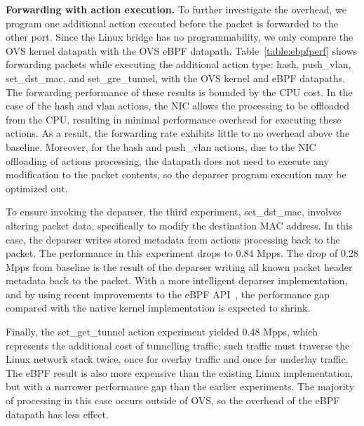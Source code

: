 \documentclass[10pt,numbers,reprint]{sigplanconf}
\begin{document}
\textbf{Forwarding with action execution.}
To further investigate the overhead,
we program one additional action executed before the packet is
forwarded to the other port.  Since the Linux bridge has no
programmability, we only compare the OVS kernel datapath with the OVS eBPF
datapath.  Table~\ref{table:ebpfperf} shows forwarding
packets while executing the additional action type: hash, push\_vlan,
set\_dst\_mac, and set\_gre\_tunnel, with the OVS kernel and eBPF datapaths.
The forwarding performance of these results is bounded by the CPU cost.
In the case of the hash and vlan actions, the NIC allows the processing
to be offloaded from the CPU, resulting in minimal performance overhead for
executing these actions.  As a result, the forwarding rate exhibits little
to no overhead above the baseline.
Moreover, for the hash and push\_vlan actions, due to the NIC offloading of
actions processing, the datapath does not need to execute any modification to
the packet contents, so the deparser program execution may be optimized out.

To ensure invoking the deparser, the third experiment, set\_dst\_mac, involves
altering packet data, specifically to modify the destination MAC address. In
this case, the deparser writes stored metadata from actions processing back to
the packet. The performance in this experiment drops to $0.84$ Mpps. The drop
of $0.28$ Mpps from baseline is the result of the deparser writing all known
packet header metadata back to the packet. With a more intelligent deparser
implementation, and by using recent improvements to the eBPF
API~\cite{dpa1,dpa2}, the performance gap compared with the native kernel
implementation is expected to shrink.

Finally, the set\_get\_tunnel action experiment yielded $0.48$ Mpps, which
represents the additional cost of tunnelling traffic; such traffic must
traverse the Linux network stack twice, once for overlay traffic and
once for underlay traffic. The eBPF result is also more expensive than
the existing Linux implementation, but with a narrower performance gap
than the earlier experiments. The majority of processing in this case occurs
outside of OVS, so the overhead of the eBPF datapath has less effect.
\end{document}
